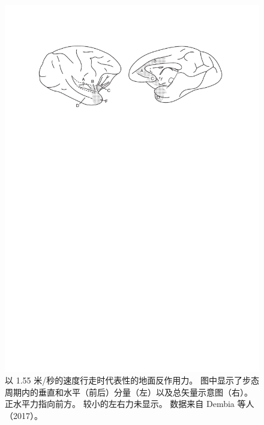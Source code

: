 \begin{figure}[!htb]
	\centering
	\includegraphics[width=1.0\linewidth]{chap2/2_4}
	\caption{以 1.55 米/秒的速度行走时代表性的地面反作用力。
		图中显示了步态周期内的垂直和水平（前后）分量（左）以及总矢量示意图（右）。
		正水平力指向前方。
		较小的左右力未显示。
		数据来自 Dembia 等人（2017）。 \label{fig:2_4}}
\end{figure}


